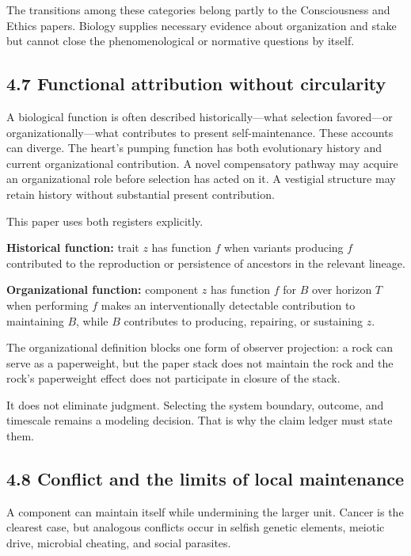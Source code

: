 \documentclass[
  11pt,
]{article}
\begin{document}
The transitions among these categories belong partly to the
Consciousness and Ethics papers. Biology supplies necessary evidence
about organization and stake but cannot close the phenomenological or
normative questions by itself.

\subsection{4.7 Functional attribution without
circularity}\label{functional-attribution-without-circularity}

A biological function is often described historically---what selection
favored---or organizationally---what contributes to present
self-maintenance. These accounts can diverge. The heart's pumping
function has both evolutionary history and current organizational
contribution. A novel compensatory pathway may acquire an organizational
role before selection has acted on it. A vestigial structure may retain
history without substantial present contribution.

This paper uses both registers explicitly.

\textbf{Historical function:} trait \(z\) has function \(f\) when
variants producing \(f\) contributed to the reproduction or persistence
of ancestors in the relevant lineage.

\textbf{Organizational function:} component \(z\) has function \(f\) for
\(B\) over horizon \(T\) when performing \(f\) makes an interventionally
detectable contribution to maintaining \(B\), while \(B\) contributes to
producing, repairing, or sustaining \(z\).

The organizational definition blocks one form of observer projection: a
rock can serve as a paperweight, but the paper stack does not maintain
the rock and the rock's paperweight effect does not participate in
closure of the stack.

It does not eliminate judgment. Selecting the system boundary, outcome,
and timescale remains a modeling decision. That is why the claim ledger
must state them.

\subsection{4.8 Conflict and the limits of local
maintenance}\label{conflict-and-the-limits-of-local-maintenance}

A component can maintain itself while undermining the larger unit.
Cancer is the clearest case, but analogous conflicts occur in selfish
genetic elements, meiotic drive, microbial cheating, and social
parasites.
\end{document}

